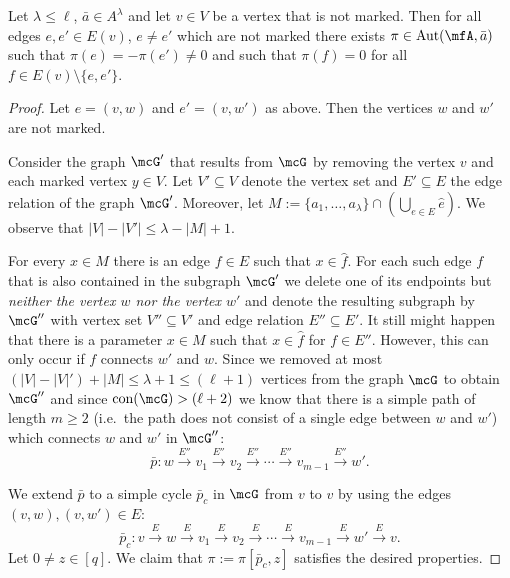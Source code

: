 \documentclass[a4paper,UKenglish]{lipics}
\newcommand{\defeq}{:=}
\newcommand{\inseg}[1]{\ensuremath{[#1]}}
\newcommand{\card}[1]{\ensuremath{|#1|}}
\newcommand{\Aut}{\ensuremath{\text{Aut}}\xspace}
\newcommand{\con}{\ensuremath{\text{con}}\xspace}
\newcommand{\ba}{{\bar a}}
\newcommand{\bp}{{\bar p}}
\theoremstyle{plain}
\begin{document}
 
\begin{lemma}\label{lemma:markedstable}
 Let $\lambda \leq \ell$, $\ba \in A^\lambda$ and let $v \in V$ be a 
vertex that is not marked.
 Then for all edges $e, e' \in E(v)$, $e \neq e'$ which are not marked 
there exists $\pi \in \Aut(\mfA,\ba)$ such that $\pi(e) = -\pi(e')\neq 0$ and 
such that $\pi(f)=0$ for all $f \in E(v) \setminus \{ e, e' \}$.
 \end{lemma}
\begin{proof}
Let $e=(v,w)$ and $e' = (v,w')$ as above.
Then the vertices $w$ and $w'$ are not marked.

Consider the graph $\mcG'$ that results from $\mcG$ by removing the vertex 
$v$ and each marked vertex $y \in V$.
Let $V' \subseteq V$ denote the vertex set and $E' \subseteq E$ 
the edge relation of the graph $\mcG'$.
Moreover, let  $M \defeq \{a_1, \dots, a_\lambda \} \cap 
(\bigcup_{e \in E} \hat e)$.
We observe that $\card {V} - \card {V'} \leq \lambda - \card M + 1$.

For every $x \in M$ there is an edge $f \in E$ such that 
$x \in \hat f$. For each such edge $f$ that is also contained in the 
subgraph $\mcG'$ we delete one of its endpoints but \emph{neither 
the vertex $w$ nor the vertex $w'$} and denote the resulting subgraph by 
$\mcG''$ with vertex set $V'' \subseteq V'$ and edge relation $E'' 
\subseteq E'$. 
It still might happen that there is a parameter $x \in M$ 
such that $x \in \hat f$ for $f \in E''$. However, this can only occur if 
$f$ connects $w'$ and $w$. 
Since we removed at most $(\card V - \card V') + \card M \leq \lambda + 1 \leq 
(\ell +1)$ vertices from the graph $\mcG$ to obtain  $\mcG''$ 
and 
since $\con(\mcG) > (\ell + 2)$ we know that there is a simple path 
of length $m \geq 2$ (i.e.\ the path does not consist of a 
single edge between $w$ 
and $w'$) which connects $w$ and $w'$ in $\mcG''$:
\[ \bar p: w \stackrel{E''}{\longrightarrow} v_1  
\stackrel{E''}{\longrightarrow} v_2 \stackrel{E''}{\longrightarrow} \cdots 
\stackrel{E''}{\longrightarrow} v_{m-1} \stackrel{E''}{\longrightarrow} w'.\]

\noindent
We extend $\bp$ to a simple cycle $\bp_c$ in $\mcG$ from $v$ to 
$v$ by 
using the edges $(v,w), (v,w') \in E$:
\[ \bar p_c: v \stackrel{E}{\longrightarrow} w 
\stackrel{E}{\longrightarrow} v_1 
\stackrel{E}{\longrightarrow} v_2 \stackrel{E}{\longrightarrow} \cdots 
\stackrel{E}{\longrightarrow} v_{m-1} \stackrel{E}{\longrightarrow} w' 
\stackrel{E}{\longrightarrow} v.\]
Let $0 \neq z \in \inseg q$. We claim that $\pi \defeq \pi[\bp_c,z]$ satisfies 
the desired properties.


\end{proof}
\end{document}

